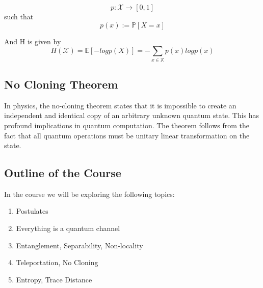 \documentclass{article}
\begin{document}
$$p : \mathcal{X} \longrightarrow [0,1]$$ such that $$p(x) := \mathbb{P}[X = x]$$

And H is given by \\
$$H(\mathcal{X}) = \mathbb{E}[-logp(X)] = -\sum_{x \in \mathbb{X}}p(x)logp(x)$$


\subsection{No Cloning Theorem}

In physics, the no-cloning theorem states that it is impossible to create an independent and identical copy of an arbitrary unknown quantum state. This has profound implications in quantum computation. The theorem follows from the fact that all quantum operations must be unitary linear transformation on the state.

\subsection{Outline of the Course}
In the course we will be exploring the following topics:

\begin{enumerate}
	\item Postulates
	\item Everything is a quantum channel
	\item Entanglement, Separability, Non-locality
	\item Teleportation, No Cloning
	\item Entropy, Trace Distance
\end{enumerate}
\end{document}
